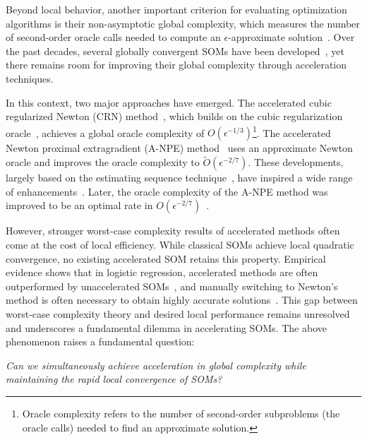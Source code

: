 \documentclass{mcom-l}
\numberwithin{equation}{section}
\begin{document}
Beyond local behavior, another important criterion for evaluating optimization algorithms is their non-asymptotic global complexity, which measures the number of second-order oracle calls needed to compute an $\epsilon$-approximate solution~\cite{cartis2022evaluation}. Over the past decades, several globally convergent SOMs have been developed~\cite{nesterov2006cubic,mishchenko_regularized_2023,jiang2024nonconvexityuniversaltrustregionmethod,heHomogeneousSecondorderDescent2025}, yet there remains room for improving their global complexity through acceleration techniques.

In this context, two major approaches have emerged. The accelerated cubic regularized Newton (CRN) method~\cite{nesterov2008accelerating}, which builds on the cubic regularization oracle~\cite{nesterov2006cubic}, achieves a global oracle complexity of $O(\epsilon^{-1/3})$\footnote{Oracle complexity refers to the number of second-order subproblems (the oracle calls) needed to find an approximate solution.}. The accelerated Newton proximal extragradient (A-NPE) method~\cite{monteiro2013accelerated} uses an approximate Newton oracle and improves the oracle complexity to $\tilde{O}(\epsilon^{-2/7})$.
These developments, largely based on the estimating sequence technique~\cite{nesterovMethodSolvingConvex1983a,baesEstimateSequenceMethods2009a}, have inspired a wide range of enhancements~\cite{jiang2021optimal,chen2022accelerating,lin2022explicit,agafonov2023inexact,agafonov2024advancing,jiang2024accelerated,huang2024inexact,doikov2020contracting}.
Later, the oracle complexity of the A-NPE method was improved to be an optimal rate in $O(\epsilon^{-2/7})$~\cite{carmon2022optimal,NEURIPS2022_e56f394b}.


However, stronger worst-case complexity results of accelerated methods often come at the cost of local efficiency.  While classical SOMs achieve local quadratic convergence, no existing accelerated SOM retains this property. Empirical evidence shows that in logistic regression, accelerated methods are often outperformed by unaccelerated SOMs~\cite{carmon2022optimal}, and manually switching to Newton’s method is often necessary to obtain highly accurate solutions~\cite{jiang2020unified,huang2024inexact,chen2022accelerating}. This gap between worst-case complexity theory and desired local performance remains unresolved and underscores a fundamental dilemma in accelerating SOMs. The above phenomenon raises a fundamental question:
\begin{center}
    \emph{Can we simultaneously achieve acceleration in global complexity while maintaining the rapid local convergence of SOMs?}
\end{center}
\end{document}
